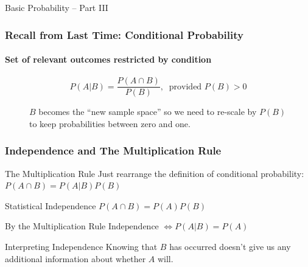 \documentclass[handout]{beamer}
\date{Lecture \# 7}
\begin{document}
 


\begin{frame}[plain]
	\titlepage 
	

\end{frame} 

\begin{frame}
\begin{center}
 \Huge Basic Probability -- Part III
\end{center}

\end{frame}


\def\EventA{(-0.35,0) circle (1.2)}
\def\EventB{(1.35,0) circle (1.2)}
\def\EventC{(-0.35,0) circle (0.6)}
\def\EventD{(0,0) circle (1.6)}
\def\SampleSpace{(-2,-2) rectangle (3,2)}

\begin{frame}
\frametitle{Recall from Last Time: Conditional Probability}
\framesubtitle{Set of relevant outcomes restricted by condition}
$$P(A|B) = \frac{P(A\cap B)}{P(B)},\;\; \mbox{provided } P(B)>0$$
\begin{figure}
\centering
{}
\caption{$B$ becomes the ``new sample space'' so we need to re-scale by $P(B)$ to keep probabilities between zero and one.}
\end{figure}
\end{frame}

\begin{frame}
\frametitle{Independence and The Multiplication Rule}
\begin{block}{The Multiplication Rule}
Just rearrange the definition of conditional probability:
$P(A\cap B) = P(A|B)P(B)$
\end{block}\pause
\begin{block}{Statistical Independence}
$P(A\cap B) = P(A)P(B)$
\end{block}\pause
\begin{alertblock}{By the Multiplication Rule}
$\mbox{Independence } \iff P(A|B) = P(A)$\\
\end{alertblock}\pause
\begin{block}{Interpreting Independence}
Knowing that $B$ has occurred doesn't give us any additional information about whether $A$ will.
\end{block}
\end{frame}
\end{document}
